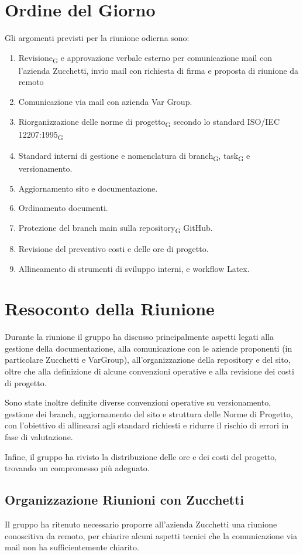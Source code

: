 \section{Ordine del Giorno}
Gli argomenti previsti per la riunione odierna sono:
\begin{enumerate}
	\item Revisione\textsubscript{G} e approvazione verbale esterno per comunicazione mail con l'azienda Zucchetti, invio mail con richiesta di firma e proposta di riunione da remoto
	\item Comunicazione via mail con azienda Var Group.
	\item Riorganizzazione delle norme di progetto\textsubscript{G} secondo lo standard ISO/IEC 12207:1995\textsubscript{G}
	\item Standard interni di gestione e nomenclatura di branch\textsubscript{G}, task\textsubscript{G} e versionamento.
	\item Aggiornamento sito e documentazione.
	\item Ordinamento documenti.
	\item Protezione del branch main sulla repository\textsubscript{G} GitHub.
	\item Revisione del preventivo costi e delle ore di progetto.
	\item Allineamento di strumenti di sviluppo interni, e workflow Latex.
\end{enumerate}

\section{Resoconto della Riunione}
Durante la riunione il gruppo ha discusso principalmente aspetti legati alla gestione della documentazione, alla comunicazione con le aziende proponenti (in particolare Zucchetti e VarGroup), all’organizzazione della repository e del sito, oltre che alla definizione di alcune convenzioni operative e alla revisione dei costi di progetto.

Sono state inoltre definite diverse convenzioni operative su versionamento, gestione dei branch, aggiornamento del sito e struttura delle Norme di Progetto, con l’obiettivo di allinearsi agli standard richiesti e ridurre il rischio di errori in fase di valutazione.

Infine, il gruppo ha rivisto la distribuzione delle ore e dei costi del progetto, trovando un compromesso più adeguato.

\subsection{Organizzazione Riunioni con Zucchetti}
Il gruppo ha ritenuto necessario proporre all'azienda Zucchetti una riunione conoscitiva da remoto, per chiarire alcuni aspetti tecnici che la comunicazione via mail non ha sufficientemente chiarito.

